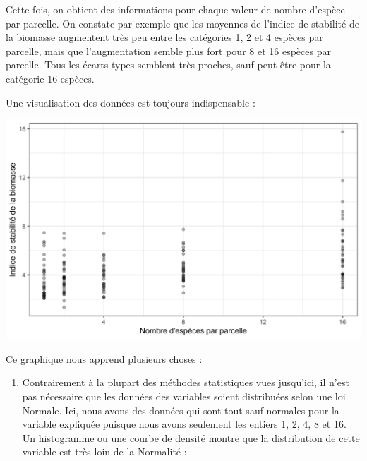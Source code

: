 \documentclass[a4paperpaper,]{article}
\newenvironment{Shaded}{\begin{snugshade}}{\end{snugshade}}
\newcommand{\DataTypeTok}[1]{\textcolor[rgb]{0.00,0.34,0.68}{#1}}
\newcommand{\FloatTok}[1]{\textcolor[rgb]{0.69,0.50,0.00}{#1}}
\newcommand{\KeywordTok}[1]{\textcolor[rgb]{0.12,0.11,0.11}{\textbf{#1}}}
\newcommand{\NormalTok}[1]{\textcolor[rgb]{0.12,0.11,0.11}{#1}}
\newcommand{\OperatorTok}[1]{\textcolor[rgb]{0.12,0.11,0.11}{#1}}
\newcommand{\StringTok}[1]{\textcolor[rgb]{0.75,0.01,0.01}{#1}}
\providecommand{\tightlist}{%
  \setlength{\itemsep}{0pt}\setlength{\parskip}{0pt}}
\begin{document}
Cette fois, on obtient des informations pour chaque valeur de nombre d'espèce par parcelle. On constate par exemple que les moyennes de l'indice de stabilité de la biomasse augmentent très peu entre les catégories 1, 2 et 4 espèces par parcelle, mais que l'augmentation semble plus fort pour 8 et 16 espèces par parcelle. Tous les écarts-types semblent très proches, sauf peut-être pour la catégorie 16 espèces.

Une visualisation des données est toujours indispensable :

\begin{Shaded}
\end{Shaded}

\begin{center}\includegraphics[width=0.9\linewidth]{figure/unnamed-chunk-113-1} \end{center}

Ce graphique nous apprend plusieurs choses :

\begin{enumerate}
\def\labelenumi{\arabic{enumi}.}
\tightlist
\item
  Contrairement à la plupart des méthodes statistiques vues jusqu'ici, il n'est pas nécessaire que les données des variables soient distribuées selon une loi Normale. Ici, nous avons des données qui sont tout sauf normales pour la variable expliquée puisque nous avons seulement les entiers 1, 2, 4, 8 et 16. Un histogramme ou une courbe de densité montre que la distribution de cette variable est très loin de la Normalité :
\end{enumerate}
\end{document}
